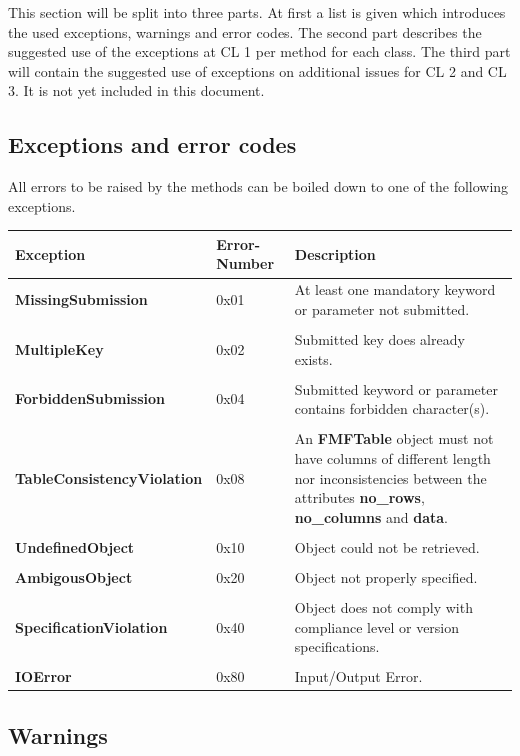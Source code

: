\documentclass[10pt,utf8, mainlanguage=english]{ufcd-info}
\newcommand{\fmfattr}[1]{{\textbf{#1}}}
\newcommand{\fmfobj}[1]{{\textbf{\textsf{#1}}}}
\begin{document}
This section will be split into three parts. At first a list is given which introduces the used exceptions, warnings and error codes. The second part describes the suggested use of the exceptions at CL 1 per method for each class. The third part will contain the suggested use of exceptions on additional issues for CL 2 and CL 3. It is not yet included in this document.

\subsection{Exceptions and error codes}

All errors to be raised by the methods can be boiled down to one of the following exceptions.

\begin{tabular}{l|l|p{5cm}}
Exception & Error-Number & Description \\
\hline
\fmfobj{MissingSubmission} & 0x01 & At least one mandatory keyword or parameter not submitted.\\
 & & \\
\fmfobj{MultipleKey} & 0x02 & Submitted key does already exists. \\
 & & \\
\fmfobj{ForbiddenSubmission} & 0x04 & Submitted keyword or parameter contains forbidden character(s).\\
 & & \\
\fmfobj{TableConsistencyViolation} & 0x08 & An \fmfobj{FMFTable} object must not have columns of different length nor inconsistencies between the attributes \fmfattr{no\_rows}, \fmfattr{no\_columns} and \fmfattr{data}.\\
 & & \\
\fmfobj{UndefinedObject} & 0x10 & Object could not be retrieved.\\
 & & \\
\fmfobj{AmbigousObject} & 0x20 & Object not properly specified.\\
 & & \\
\fmfobj{SpecificationViolation} & 0x40 & Object does not comply with compliance level or version specifications.\\
 & & \\
\fmfobj{IOError} & 0x80 & Input/Output Error.
\end{tabular}

\subsection{Warnings}
\end{document}
